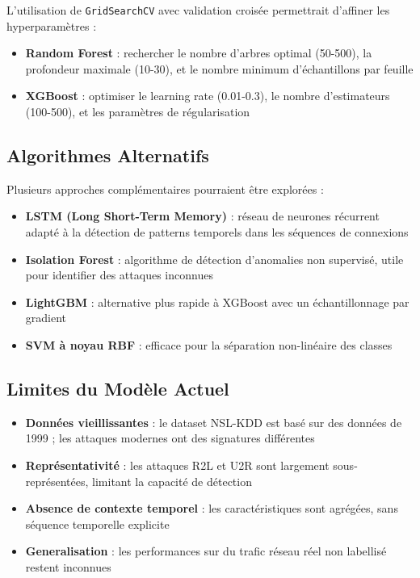 \documentclass[12pt,a4paper]{article}
\begin{document}
L'utilisation de \texttt{GridSearchCV} avec validation croisée permettrait d'affiner les hyperparamètres :

\begin{itemize}
    \item \textbf{Random Forest} : rechercher le nombre d'arbres optimal (50-500), la profondeur maximale (10-30), et le nombre minimum d'échantillons par feuille
    \item \textbf{XGBoost} : optimiser le learning rate (0.01-0.3), le nombre d'estimateurs (100-500), et les paramètres de régularisation
\end{itemize}

\subsection{Algorithmes Alternatifs}

Plusieurs approches complémentaires pourraient être explorées :

\begin{itemize}
    \item \textbf{LSTM (Long Short-Term Memory)} : réseau de neurones récurrent adapté à la détection de patterns temporels dans les séquences de connexions
    \item \textbf{Isolation Forest} : algorithme de détection d'anomalies non supervisé, utile pour identifier des attaques inconnues
    \item \textbf{LightGBM} : alternative plus rapide à XGBoost avec un échantillonnage par gradient
    \item \textbf{SVM à noyau RBF} : efficace pour la séparation non-linéaire des classes
\end{itemize}

\subsection{Limites du Modèle Actuel}

\begin{itemize}
    \item \textbf{Données vieillissantes} : le dataset NSL-KDD est basé sur des données de 1999 ; les attaques modernes ont des signatures différentes
    \item \textbf{Représentativité} : les attaques R2L et U2R sont largement sous-représentées, limitant la capacité de détection
    \item \textbf{Absence de contexte temporel} : les caractéristiques sont agrégées, sans séquence temporelle explicite
    \item \textbf{Generalisation} : les performances sur du trafic réseau réel non labellisé restent inconnues
\end{itemize}
\end{document}
